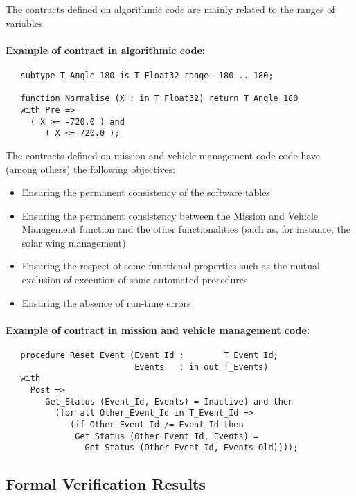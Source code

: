 \documentclass[10pt,a4paper,twocolumn]{article}
\begin{document}
The contracts defined on algorithmic code are mainly related to the ranges of variables.

\ifdefined\abstractonly
\else
\paragraph{Example of contract in algorithmic code:}

\begin{verbatim}
   subtype T_Angle_180 is T_Float32 range -180 .. 180;

   function Normalise (X : in T_Float32) return T_Angle_180
   with Pre =>
     ( X >= -720.0 ) and
        ( X <= 720.0 );
\end{verbatim}
\fi

The contracts defined on mission and vehicle management code code have (among others) the following objectives:

\begin{itemize}
\item Ensuring the permanent consistency of the software tables
\item Ensuring the permanent consistency between the Mission and Vehicle Management function and the other functionalities (such as, for instance, the solar wing management)
\item Ensuring the respect of some functional properties such as the mutual exclusion of execution of some automated procedures
\item Ensuring the absence of run-time errors
\end{itemize}

\ifdefined\abstractonly
\else
\paragraph{Example of contract in mission and vehicle management code:}

\begin{verbatim}
   procedure Reset_Event (Event_Id :        T_Event_Id;
                          Events   : in out T_Events)
   with
     Post =>
        Get_Status (Event_Id, Events) = Inactive) and then
          (for all Other_Event_Id in T_Event_Id =>
             (if Other_Event_Id /= Event_Id then
              Get_Status (Other_Event_Id, Events) =
                Get_Status (Other_Event_Id, Events'Old))));
\end{verbatim}
\fi

\subsection{Formal Verification Results}
\end{document}
